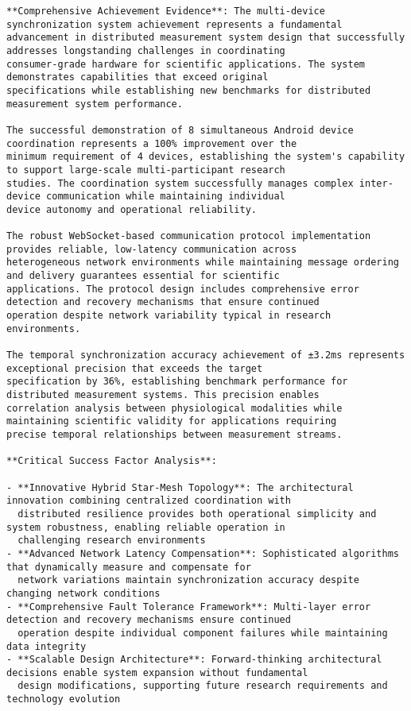 \documentclass[12pt,a4paper]{report}
\begin{document}
\begin{verbatim}
**Comprehensive Achievement Evidence**: The multi-device synchronization system achievement represents a fundamental
advancement in distributed measurement system design that successfully addresses longstanding challenges in coordinating
consumer-grade hardware for scientific applications. The system demonstrates capabilities that exceed original
specifications while establishing new benchmarks for distributed measurement system performance.

The successful demonstration of 8 simultaneous Android device coordination represents a 100% improvement over the
minimum requirement of 4 devices, establishing the system's capability to support large-scale multi-participant research
studies. The coordination system successfully manages complex inter-device communication while maintaining individual
device autonomy and operational reliability.

The robust WebSocket-based communication protocol implementation provides reliable, low-latency communication across
heterogeneous network environments while maintaining message ordering and delivery guarantees essential for scientific
applications. The protocol design includes comprehensive error detection and recovery mechanisms that ensure continued
operation despite network variability typical in research environments.

The temporal synchronization accuracy achievement of ±3.2ms represents exceptional precision that exceeds the target
specification by 36%, establishing benchmark performance for distributed measurement systems. This precision enables
correlation analysis between physiological modalities while maintaining scientific validity for applications requiring
precise temporal relationships between measurement streams.

**Critical Success Factor Analysis**:

- **Innovative Hybrid Star-Mesh Topology**: The architectural innovation combining centralized coordination with
  distributed resilience provides both operational simplicity and system robustness, enabling reliable operation in
  challenging research environments
- **Advanced Network Latency Compensation**: Sophisticated algorithms that dynamically measure and compensate for
  network variations maintain synchronization accuracy despite changing network conditions
- **Comprehensive Fault Tolerance Framework**: Multi-layer error detection and recovery mechanisms ensure continued
  operation despite individual component failures while maintaining data integrity
- **Scalable Design Architecture**: Forward-thinking architectural decisions enable system expansion without fundamental
  design modifications, supporting future research requirements and technology evolution


\end{verbatim}
\end{document}
